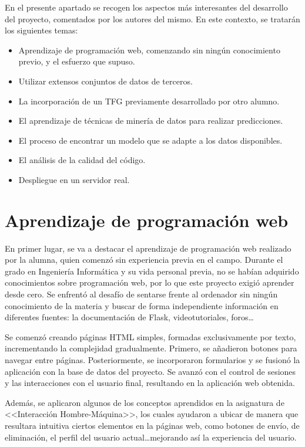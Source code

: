 
En el presente apartado se recogen los aspectos más interesantes del desarrollo del proyecto, comentados por los autores del mismo.
En este contexto, se tratarán los siguientes temas:
\begin{itemize}
    \item Aprendizaje de programación web, comenzando sin ningún conocimiento previo, y el esfuerzo que supuso.
    \item Utilizar extensos conjuntos de datos de terceros.
    \item La incorporación de un TFG previamente desarrollado por otro alumno.
    \item El aprendizaje de técnicas de minería de datos para realizar predicciones.
    \item El proceso de encontrar un modelo que se adapte a los datos disponibles.
    \item El análisis de la calidad del código.
    \item Despliegue en un servidor real.
\end{itemize}


\section{Aprendizaje de programación web}
En primer lugar, se va a destacar el aprendizaje de programación web realizado por la alumna, quien comenzó sin experiencia previa en el campo. Durante el grado en Ingeniería Informática y su vida personal previa, no se habían adquirido conocimientos sobre programación web, por lo que este proyecto exigió aprender desde cero. Se enfrentó al desafío de sentarse frente al ordenador sin ningún conocimiento de la materia y buscar de forma independiente información en diferentes fuentes: la documentación de Flask, videotutoriales, foros\ldots

Se comenzó creando páginas HTML simples, formadas exclusivamente por texto, incrementando la complejidad gradualmente. Primero, se añadieron botones para navegar entre páginas. Posteriormente, se incorporaron formularios y se fusionó la aplicación con la base de datos del proyecto. Se avanzó con el control de sesiones y las interacciones con el usuario final, resultando en la aplicación web obtenida.

Además, se aplicaron algunos de los conceptos aprendidos en la asignatura de <<Interacción Hombre-Máquina>>, los cuales ayudaron a ubicar de manera que resultara intuitiva ciertos elementos en la páginas web, como botones de envío, de eliminación, el perfil del usuario actual\ldots mejorando así la experiencia del usuario. 

